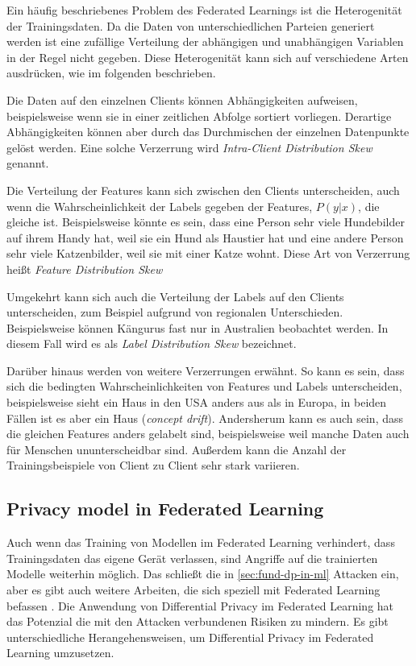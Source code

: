 Ein häufig beschriebenes Problem des Federated Learnings ist die Heterogenität der Trainingsdaten. Da die Daten von unterschiedlichen Parteien generiert werden ist eine zufällige Verteilung der abhängigen und unabhängigen Variablen in der Regel nicht gegeben. Diese Heterogenität kann sich auf verschiedene Arten ausdrücken, wie im folgenden beschrieben.

Die Daten auf den einzelnen Clients können Abhängigkeiten aufweisen, beispielsweise wenn sie in einer zeitlichen Abfolge sortiert vorliegen. Derartige Abhängigkeiten können aber durch das Durchmischen der einzelnen Datenpunkte gelöst werden. Eine solche Verzerrung wird \textit{Intra-Client Distribution Skew} genannt.

Die Verteilung der Features kann sich zwischen den Clients unterscheiden, auch wenn die Wahrscheinlichkeit der Labels gegeben der Features, $P(y|x)$, die gleiche ist. Beispielsweise könnte es sein, dass eine Person sehr viele Hundebilder auf ihrem Handy hat, weil sie ein Hund als Haustier hat und eine andere Person sehr viele Katzenbilder, weil sie mit einer Katze wohnt. Diese Art von Verzerrung heißt \textit{Feature Distribution Skew}

Umgekehrt kann sich auch die Verteilung der Labels auf den Clients unterscheiden, zum Beispiel aufgrund von regionalen Unterschieden. Beispielsweise können Kängurus fast nur in Australien beobachtet werden. In diesem Fall wird es als \textit{Label Distribution Skew} bezeichnet.

Darüber hinaus werden von \textcite{kairouz:2021} weitere Verzerrungen erwähnt. So kann es sein, dass sich die bedingten Wahrscheinlichkeiten von Features und Labels unterscheiden, beispielsweise sieht ein Haus in den USA anders aus als in Europa, in beiden Fällen ist es aber ein Haus (\textit{concept drift}). Andersherum kann es auch sein, dass die gleichen Features anders gelabelt sind, beispielsweise weil manche Daten auch für Menschen ununterscheidbar sind. Außerdem kann die Anzahl der Trainingsbeispiele von Client zu Client sehr stark variieren. 

\subsection{Privacy model in Federated Learning}\label{sec:pm-in-fl}
Auch wenn das Training von Modellen im Federated Learning verhindert, dass Trainingsdaten das eigene Gerät verlassen, sind Angriffe auf die trainierten Modelle weiterhin möglich. Das schließt die in \autoref{sec:fund-dp-in-ml} Attacken ein, aber es gibt auch weitere Arbeiten, die sich speziell mit Federated Learning befassen \cite{geiping:2020, wang:2019}. Die Anwendung von Differential Privacy im Federated Learning hat das Potenzial die mit den Attacken verbundenen Risiken zu mindern. Es gibt unterschiedliche Herangehensweisen, um Differential Privacy im Federated Learning umzusetzen.

